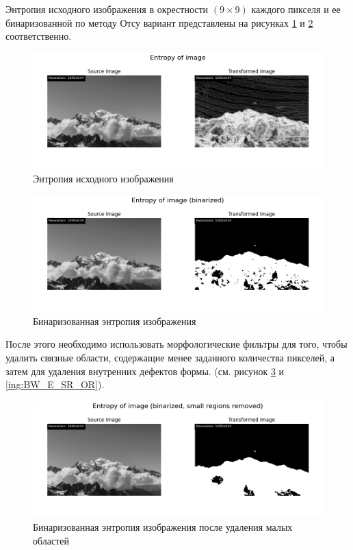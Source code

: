 Энтропия исходного изображения в окрестности $(9 \times 9)$ каждого пикселя и ее бинаризованной по методу Отсу вариант представлены на рисунках \ref{img:texture_entropy} и \ref{img:texture_entropy_bin} соответственно.
\begin{figure}[ht!]
    \centering
    \includegraphics[width=\textwidth]{../results/Entropy of image.png}
    \caption{Энтропия исходного изображения}
    \label{img:texture_entropy}
\end{figure}

\begin{figure}[ht!]
    \centering
    \includegraphics[width=\textwidth]{../results/Entropy of image (binarized).png}
    \caption{Бинаризованная энтропия изображения}
    \label{img:texture_entropy_bin}
\end{figure}

\FloatBarrier
После этого необходимо использовать морфологические фильтры для того, чтобы удалить связные области, содержащие
менее заданного количества пикселей, а затем для удаления внутренних дефектов формы. (см. рисунок \ref{img:BW_E_SR} и \ref{ing:BW_E_SR_OR}).

\begin{figure}[ht!]
    \centering
    \includegraphics[width=\textwidth]{../results/Entropy of image (binarized, small regions removed).png}
    \caption{Бинаризованная энтропия изображения после удаления малых областей}
    \label{img:BW_E_SR}
\end{figure}

